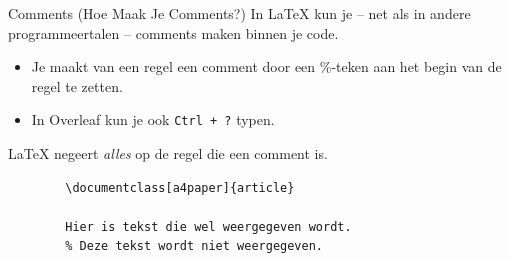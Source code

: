 \begin{frame}[fragile]{Comments (Hoe Maak Je Comments?)}
    In \LaTeX{} kun je -- net als in andere programmeertalen -- comments maken binnen je code. 
    \begin{itemize}[label={\textbullet}]
        \item Je maakt van een regel een comment door een \%-teken aan het begin van de regel te zetten. 
        \item In Overleaf kun je ook \;\texttt{Ctrl + ?} \; typen.
    \end{itemize}
    \LaTeX{} negeert \emph{alles} op de regel die een comment is. 
    \pause
    \begin{verbatim}
        \documentclass[a4paper]{article}
        
        Hier is tekst die wel weergegeven wordt. 
        % Deze tekst wordt niet weergegeven. 
        
    \end{verbatim}
\end{frame}
